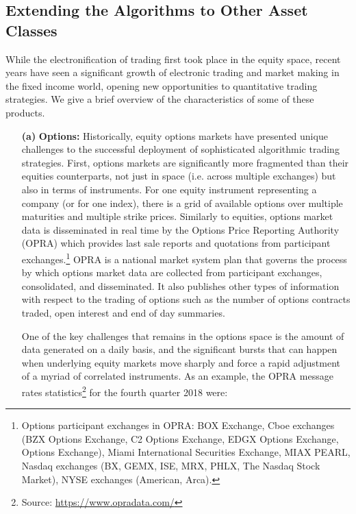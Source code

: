 \subsection{Extending the Algorithms to Other Asset Classes}

While the electronification of trading first took place in the equity space, recent years have seen a significant growth of electronic trading and market making in the fixed income world, opening new opportunities to quantitative trading strategies. We give a brief overview of the characteristics of some of these products. 


\begin{enumerate}
\item[\textbf{(a)}] \textbf{Options:} Historically, equity options markets have presented unique challenges to the successful deployment of sophisticated algorithmic trading strategies. First, options markets are significantly more fragmented than their equities counterparts, not just in space (i.e. across multiple exchanges) but also in terms of instruments. For one equity instrument representing a company (or for one index), there is a grid of available options over multiple maturities and multiple strike prices. Similarly to equities, options market data is disseminated in real time by the Options Price Reporting Authority (OPRA) which provides last sale reports and quotations from participant exchanges.\footnote{Options participant exchanges in OPRA: BOX Exchange, Cboe exchanges (BZX Options Exchange, C2 Options Exchange, EDGX Options Exchange, Options Exchange), Miami International Securities Exchange, MIAX PEARL, Nasdaq exchanges (BX, GEMX, ISE, MRX, PHLX, The Nasdaq Stock Market), NYSE exchanges (American, Arca).} OPRA is a national market system plan that governs the process by which options market data are collected from participant exchanges, consolidated, and disseminated. It also publishes other types of information with respect to the trading of options such as the number of options contracts traded, open interest and end of day summaries. 


One of the key challenges that remains in the options space is the amount of data generated on a daily basis, and the significant bursts that can happen when underlying equity markets move sharply and force a rapid adjustment of a myriad of correlated instruments. As an example, the OPRA message rates statistics\footnote{Source: \url{https://www.opradata.com/}} for the fourth quarter 2018 were: \\


\end{enumerate}
